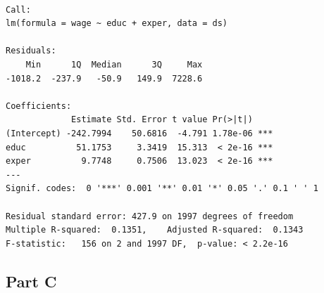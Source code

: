 \documentclass[
  letterpaper,
  DIV=11,
  numbers=noendperiod]{scrartcl}
\begin{document}
\begin{verbatim}

Call:
lm(formula = wage ~ educ + exper, data = ds)

Residuals:
    Min      1Q  Median      3Q     Max 
-1018.2  -237.9   -50.9   149.9  7228.6 

Coefficients:
             Estimate Std. Error t value Pr(>|t|)    
(Intercept) -242.7994    50.6816  -4.791 1.78e-06 ***
educ          51.1753     3.3419  15.313  < 2e-16 ***
exper          9.7748     0.7506  13.023  < 2e-16 ***
---
Signif. codes:  0 '***' 0.001 '**' 0.01 '*' 0.05 '.' 0.1 ' ' 1

Residual standard error: 427.9 on 1997 degrees of freedom
Multiple R-squared:  0.1351,    Adjusted R-squared:  0.1343 
F-statistic:   156 on 2 and 1997 DF,  p-value: < 2.2e-16
\end{verbatim}

\newpage{}

\hypertarget{part-c-2}{%
\subsection{Part C}\label{part-c-2}}
\end{document}

